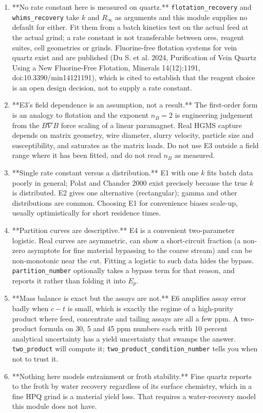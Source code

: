 \documentclass[10pt,a4paper,twoside]{report}
\begin{document}
\begin{enumerate}[leftmargin=*,label=\arabic*.]
\item **No rate constant here is measured on quartz.** \texttt{flotation\_recovery} and \texttt{whims\_recovery} take $k$ and $R_{\infty}$ as arguments and this module supplies no default for either. Fit them from a batch kinetics test on the actual feed at the actual grind; a rate constant is not transferable between ores, reagent suites, cell geometries or grinds. Fluorine-free flotation systems for vein quartz exist and are published (Du S. et al. 2024, Purification of Vein Quartz Using a New Fluorine-Free Flotation, Minerals 14(12):1191, doi:10.3390/min14121191), which is cited to establish that the reagent choice is an open design decision, not to supply a rate constant.
\item **E3's field dependence is an assumption, not a result.** The first-order form is an analogy to flotation and the exponent $n_B = 2$ is engineering judgement from the $B \nabla B$ force scaling of a linear paramagnet. Real HGMS capture depends on matrix geometry, wire diameter, slurry velocity, particle size and susceptibility, and saturates as the matrix loads. Do not use E3 outside a field range where it has been fitted, and do not read $n_B$ as measured.
\item **Single rate constant versus a distribution.** E1 with one $k$ fits batch data poorly in general; Polat and Chander 2000 exist precisely because the true $k$ is distributed. E2 gives one alternative (rectangular); gamma and other distributions are common. Choosing E1 for convenience biases scale-up, usually optimistically for short residence times.
\item **Partition curves are descriptive.** E4 is a convenient two-parameter logistic. Real curves are asymmetric, can show a short-circuit fraction (a non-zero asymptote for fine material bypassing to the coarse stream) and can be non-monotonic near the cut. Fitting a logistic to such data hides the bypass. \texttt{partition\_number} optionally takes a bypass term for that reason, and reports it rather than folding it into $E_p$.
\item **Mass balance is exact but the assays are not.** E6 amplifies assay error badly when $c - t$ is small, which is exactly the regime of a high-purity product where feed, concentrate and tailing assays are all a few ppm. A two-product formula on 30, 5 and 45 ppm numbers each with 10 percent analytical uncertainty has a yield uncertainty that swamps the answer. \texttt{two\_product} will compute it; \texttt{two\_product\_condition\_number} tells you when not to trust it.
\item **Nothing here models entrainment or froth stability.** Fine quartz reports to the froth by water recovery regardless of its surface chemistry, which in a fine HPQ grind is a material yield loss. That requires a water-recovery model this module does not have.
\end{enumerate}
\end{document}

